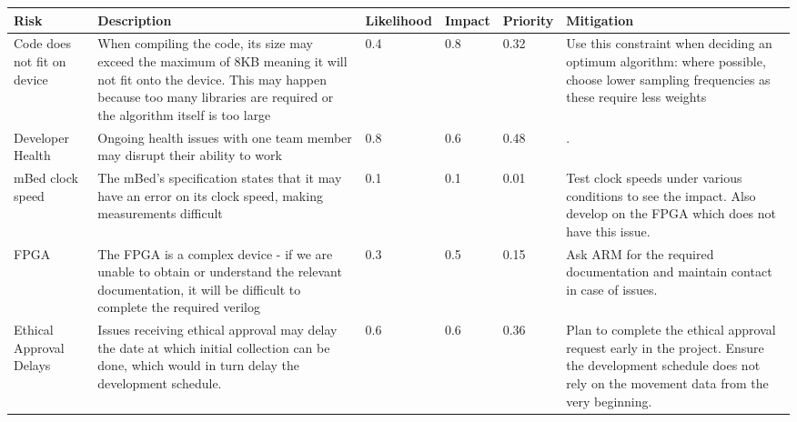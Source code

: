 \begin{landscape}
\begin{center}
\begin{tabular}{ | m{2cm} | m{7cm} | m{2cm} | m{1.5cm} | m{1.5cm} | m{7cm} | } 
  \hline
  Risk & Description & Likelihood & Impact & Priority & Mitigation \\
  \hline

  Code does not fit on device &
  When compiling the code, its size may exceed the maximum of 8KB meaning it will not fit onto the device. This may happen because too many libraries are required or the algorithm itself is too large &
  0.4 & 0.8 & 0.32 &
  Use this constraint when deciding an optimum algorithm: where possible, choose lower sampling frequencies as these require less weights \\
  \hline

  Developer Health &
  Ongoing health issues with one team member may disrupt their ability to work &
  0.8 & 0.6 & 0.48 &
  . \\
  \hline
  
  mBed clock speed &
  The mBed's specification states that it may have an error on its clock speed, making measurements difficult &
  0.1 & 0.1 & 0.01 &
  Test clock speeds under various conditions to see the impact. Also develop on the FPGA which does not have this issue. \\
  \hline
  
  FPGA &
  The FPGA is a complex device - if we are unable to obtain or understand the relevant documentation, it will be difficult to complete the required verilog &
  0.3 & 0.5 & 0.15 &
  Ask ARM for the required documentation and maintain contact in case of issues. \\
  \hline
  
  Ethical Approval Delays &
  Issues receiving ethical approval may delay the date at which initial collection can be done, which would in turn delay the development schedule. &
  0.6 & 0.6 & 0.36 &
  Plan to complete the ethical approval request early in the project. Ensure the development schedule does not rely on the movement data from the very beginning. \\
  \hline
 
\end{tabular}
\end{center}
\end{landscape}
